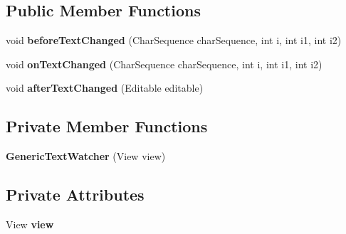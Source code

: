 \subsection*{Public Member Functions}
\begin{DoxyCompactItemize}
\item 
void {\bfseries before\+Text\+Changed} (Char\+Sequence char\+Sequence, int i, int i1, int i2)\hypertarget{classcom_1_1example_1_1sebastian_1_1tindertp_1_1ExpandedListAdapters_1_1ExpandableListAdapter_1_1GenericTextWatcher_a9a813ed5e9616fc833b78bc7ea9e8763}{}\label{classcom_1_1example_1_1sebastian_1_1tindertp_1_1ExpandedListAdapters_1_1ExpandableListAdapter_1_1GenericTextWatcher_a9a813ed5e9616fc833b78bc7ea9e8763}

\item 
void {\bfseries on\+Text\+Changed} (Char\+Sequence char\+Sequence, int i, int i1, int i2)\hypertarget{classcom_1_1example_1_1sebastian_1_1tindertp_1_1ExpandedListAdapters_1_1ExpandableListAdapter_1_1GenericTextWatcher_a5a75d90ad8466d49fb8b40eafcbda9f2}{}\label{classcom_1_1example_1_1sebastian_1_1tindertp_1_1ExpandedListAdapters_1_1ExpandableListAdapter_1_1GenericTextWatcher_a5a75d90ad8466d49fb8b40eafcbda9f2}

\item 
void {\bfseries after\+Text\+Changed} (Editable editable)\hypertarget{classcom_1_1example_1_1sebastian_1_1tindertp_1_1ExpandedListAdapters_1_1ExpandableListAdapter_1_1GenericTextWatcher_a813c87328882f4f7f2f2446c924ba2fc}{}\label{classcom_1_1example_1_1sebastian_1_1tindertp_1_1ExpandedListAdapters_1_1ExpandableListAdapter_1_1GenericTextWatcher_a813c87328882f4f7f2f2446c924ba2fc}

\end{DoxyCompactItemize}
\subsection*{Private Member Functions}
\begin{DoxyCompactItemize}
\item 
{\bfseries Generic\+Text\+Watcher} (View view)\hypertarget{classcom_1_1example_1_1sebastian_1_1tindertp_1_1ExpandedListAdapters_1_1ExpandableListAdapter_1_1GenericTextWatcher_a8b96f118cccd7d78f351056dcffc7262}{}\label{classcom_1_1example_1_1sebastian_1_1tindertp_1_1ExpandedListAdapters_1_1ExpandableListAdapter_1_1GenericTextWatcher_a8b96f118cccd7d78f351056dcffc7262}

\end{DoxyCompactItemize}
\subsection*{Private Attributes}
\begin{DoxyCompactItemize}
\item 
View {\bfseries view}\hypertarget{classcom_1_1example_1_1sebastian_1_1tindertp_1_1ExpandedListAdapters_1_1ExpandableListAdapter_1_1GenericTextWatcher_aaa2e9cc90598a67c5dfe38aa377140f7}{}\label{classcom_1_1example_1_1sebastian_1_1tindertp_1_1ExpandedListAdapters_1_1ExpandableListAdapter_1_1GenericTextWatcher_aaa2e9cc90598a67c5dfe38aa377140f7}

\end{DoxyCompactItemize}



